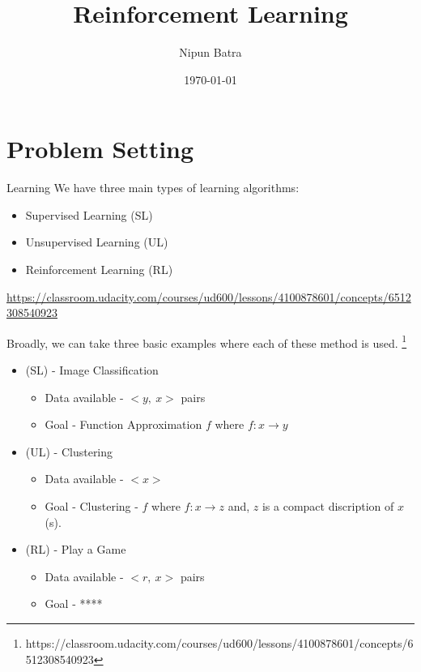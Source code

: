 \documentclass{beamer}
\title{Reinforcement Learning}
\date{\today}
\author{Nipun Batra}
\institute{IIT Gandhinagar}
\begin{document}
	\maketitle
	
	
	
	\section{Problem Setting}
	\begin{frame}{Learning}
		We have three main types of learning algorithms:
		
		\begin{itemize}
			\item Supervised Learning (SL)
			\item Unsupervised Learning (UL)
			\item Reinforcement Learning (RL)
		\end{itemize}
	\end{frame}

\begin{frame}
	\urldef\diff\url{https://classroom.udacity.com/courses/ud600/lessons/4100878601/concepts/6512308540923}
	
	Broadly, we can take three basic examples where each of these method is used. \footnote{https://classroom.udacity.com/courses/ud600/lessons/4100878601/concepts/6512308540923}
	
	\begin{itemize}
		\item (SL) - Image Classification
		\begin{itemize}
			\item Data available - $<y, \ x>$ pairs
			\item Goal - Function Approximation $f$ where $f : x \rightarrow y$
		\end{itemize}
		\item (UL) - Clustering
		\begin{itemize}
			\item Data available - $<x>$
			\item Goal - Clustering - $f$ where $f : x \rightarrow z$ and, $z$ is a compact discription of $x$(s).
		\end{itemize}
		\item (RL) - Play a Game
		\begin{itemize}
			\item Data available - $<r, \ x>$ pairs
			\item Goal - ****
		\end{itemize}
	\end{itemize}
\end{frame}
\end{document}
